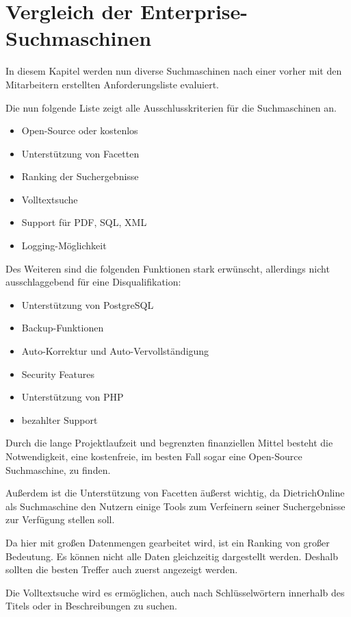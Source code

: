 \chapter{Vergleich der Enterprise-Suchmaschinen}

In diesem Kapitel werden nun diverse Suchmaschinen nach einer vorher mit den Mitarbeitern erstellten Anforderungsliste evaluiert.

Die nun folgende Liste zeigt alle Ausschlusskriterien für die Suchmaschinen an.
\begin{itemize}
    \item Open-Source oder kostenlos
    \item Unterstützung von Facetten
    \item Ranking der Suchergebnisse
    \item Volltextsuche
    \item Support für PDF, SQL, XML
    \item Logging-Möglichkeit
\end{itemize}

Des Weiteren sind die folgenden Funktionen stark erwünscht, allerdings nicht ausschlaggebend für eine Disqualifikation:

\begin{itemize}
    \item Unterstützung von PostgreSQL
    \item Backup-Funktionen
    \item Auto-Korrektur und Auto-Vervollständigung
    \item Security Features
    \item Unterstützung von PHP
    \item bezahlter Support
\end{itemize}

Durch die lange Projektlaufzeit und begrenzten finanziellen Mittel besteht die Notwendigkeit, eine kostenfreie, im besten Fall sogar eine Open-Source Suchmaschine, zu finden. 

Außerdem ist die Unterstützung von Facetten äußerst wichtig, da DietrichOnline als Suchmaschine den Nutzern einige Tools zum Verfeinern seiner Suchergebnisse zur Verfügung stellen soll.

Da hier mit großen Datenmengen gearbeitet wird, ist ein Ranking von großer Bedeutung. Es können nicht alle Daten gleichzeitig dargestellt werden. Deshalb sollten die besten Treffer auch zuerst angezeigt werden.

Die Volltextsuche wird es ermöglichen, auch nach Schlüsselwörtern innerhalb des Titels oder in Beschreibungen zu suchen.

